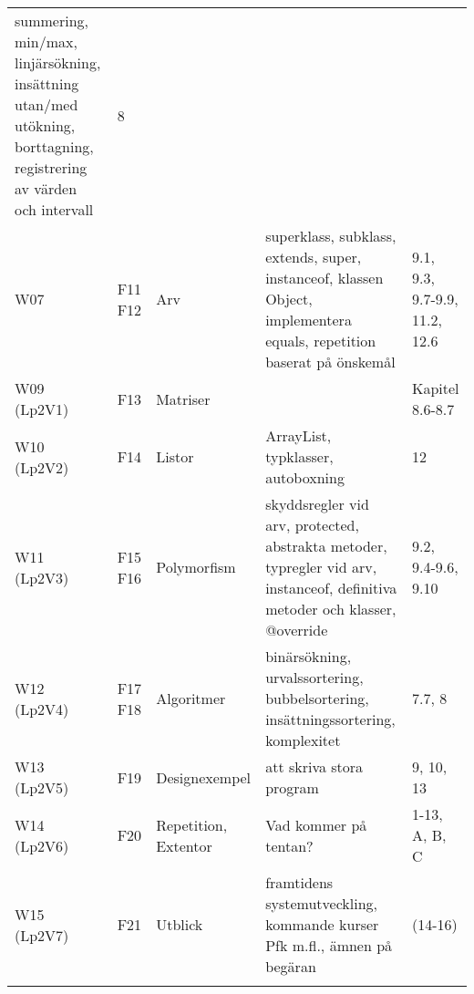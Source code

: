 \begin{longtable}[c]{@{}lllll@{}}
summering, min/max, linjärsökning, insättning utan/med utökning,
borttagning, registrering av värden och intervall & 8
\\\addlinespace
W07 & F11 F12 & Arv & superklass, subklass, extends, super, instanceof,
klassen Object, implementera equals, repetition baserat på önskemål &
9.1, 9.3, 9.7-9.9, 11.2, 12.6
\\\addlinespace
W09 (Lp2V1) & F13 & Matriser & & Kapitel 8.6-8.7
\\\addlinespace
W10 (Lp2V2) & F14 & Listor & ArrayList, typklasser, autoboxning & 12
\\\addlinespace
W11 (Lp2V3) & F15 F16 & Polymorfism & skyddsregler vid arv, protected,
abstrakta metoder, typregler vid arv, instanceof, definitiva metoder och
klasser, @override & 9.2, 9.4-9.6, 9.10
\\\addlinespace
W12 (Lp2V4) & F17 F18 & Algoritmer & binärsökning, urvalssortering,
bubbelsortering, insättningssortering, komplexitet & 7.7, 8
\\\addlinespace
W13 (Lp2V5) & F19 & Designexempel & att skriva stora program & 9, 10, 13
\\\addlinespace
W14 (Lp2V6) & F20 & Repetition, Extentor & Vad kommer på tentan? & 1-13,
A, B, C
\\\addlinespace
W15 (Lp2V7) & F21 & Utblick & framtidens systemutveckling, kommande
kurser Pfk m.fl., ämnen på begäran & (14-16)
\\\addlinespace
\bottomrule
\end{longtable}
